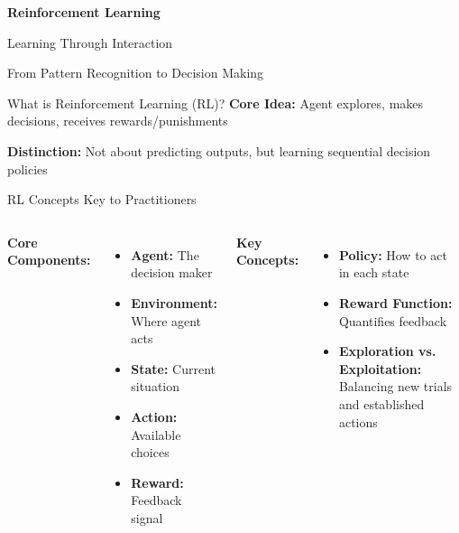 \documentclass[aspectratio=169]{beamer}
\begin{document}
\begin{frame}[plain]
  \begin{center}
    \vspace{2cm}
    \Huge\textbf{Reinforcement Learning}
    
    \vspace{1cm}
    \Large Learning Through Interaction
    
    \vspace{2cm}
    \normalsize From Pattern Recognition to Decision Making
  \end{center}
\end{frame}

\begin{frame}{What is Reinforcement Learning (RL)?}
  \textbf{Core Idea:} Agent explores, makes decisions, receives
  rewards/punishments

  \vspace{0.5cm}
  \begin{center}
  \end{center}

  \vspace{0.5cm}
  \textbf{Distinction:} Not about predicting outputs, but learning
  sequential decision policies
\end{frame}

\begin{frame}{RL Concepts Key to Practitioners}
  \begin{columns}
    \textbf{Core Components:}
    \begin{itemize}
      \item \textbf{Agent:} The decision maker
      \item \textbf{Environment:} Where agent acts
      \item \textbf{State:} Current situation
      \item \textbf{Action:} Available choices
      \item \textbf{Reward:} Feedback signal
    \end{itemize}

    \textbf{Key Concepts:}
    \begin{itemize}
      \item \textbf{Policy:} How to act in each state
      \item \textbf{Reward Function:} Quantifies feedback
      \item \textbf{Exploration vs. Exploitation:} Balancing new
        trials and established actions
    \end{itemize}
  \end{columns}
\end{frame}
\end{document}
